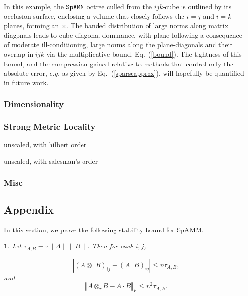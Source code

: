 \documentclass[letterpaper,twocolumn,amsmath,amsfont,amssymb,english,aps,jcp,preprintnumbers,groupaddress,nofootinbib,tightenlines,floatfix]{revtex4}
\theoremstyle{plain}
\theoremstyle{remark}
\theoremstyle{plain}
\newtheorem{prop}[thm]{\protect\propositionname}
\providecommand{\propositionname}{Proposition}
\begin{document}
In this example, the $\tt SpAMM$ octree culled from the $ijk$-cube is outlined by its occlusion surface, enclosing 
a volume that closely follows the $i=j$ and $i=k$ planes, forming an $\times$.  The banded distribution
of large norms along  matrix diagonals leads to cube-diagonal dominance, with plane-following 
a consequence of moderate ill-conditioning,  large norms along the plane-diagonals and their overlap in $ijk$
via the multiplicative bound, Eq.~(\ref{bound}). The tightness of this bound, and the compression gained relative
to  methods that control only the absolute error, {\em e.g.} as given by Eq.~(\ref{sparseapprox}), will hopefully
be quantified in future work. 

\subsubsection{Dimensionality}

\subsubsection{Strong Metric Locality}

unscaled, with hilbert order

unscaled, with salesman's order

\subsubsection{Misc}

\subsection{Appendix}

In this section, we prove the following stability bound for SpAMM.

\begin{prop}
\label{lem:SpAMM mult, prop}
Let $\tau_{A,B} = \tau \| A \| \| B \| $. Then for each $i,j$,

\[
\left|\left(A\otimes_{\tau}B\right)_{ij}-\left(A\cdot B\right)_{ij}\right|\leq n\tau_{A,B},
\]
and
\[
\left\Vert A\otimes_{\tau}B-A\cdot B\right\Vert _{F}\leq n^{2}\tau_{A,B}.
\]
\end{prop}
\end{document}
